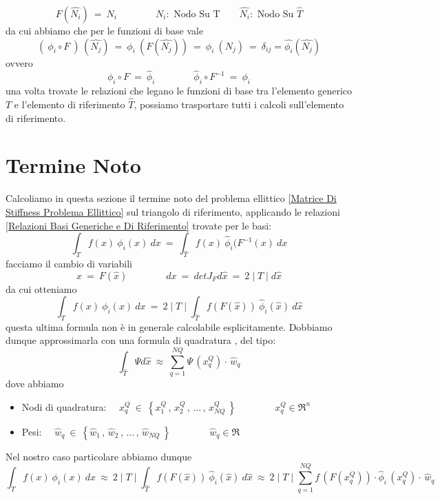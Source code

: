 \documentclass[12pt,a4paper]{report}
\theoremstyle{theorem}
\theoremstyle{theorem}
\theoremstyle{definition}
\begin{document}
\[ F (\hat{N_{i}}) \ = \ N_{i} \qquad \qquad N_{i}: \text{ Nodo Su T} \qquad \hat{N_{i}}: \text{ Nodo Su } \hat{T}  \]
da cui abbiamo che per le funzioni di base vale
\[ ( \ \phi_{i} \circ F \ ) \, (\hat{N_{j}}) \ = \ \phi_{i} \ ( F(\hat{N_{j}})) \ = \ \phi_{i} \ (N_{j}) \ = \ \delta_{ij} = \hat{\phi_{i}}(\hat{N_{j}}) \]
ovvero  \label{Relazioni Basi Generiche e Di Riferimento} 
\[ \phi_{i} \circ F \ = \ \hat{\phi}_{i} \qquad \qquad \hat{\phi}_{i} \circ F^{-1} \ = \ \phi_{i} \]
una volta trovate le relazioni che legano le funzioni di base tra l'elemento generico $T$ e l'elemento di riferimento $\hat{T}$, possiamo trasportare tutti i calcoli sull'elemento di riferimento.

\section{Termine Noto}
Calcoliamo in questa sezione il termine noto del problema ellittico \ref{Matrice Di Stiffness Problema Ellittico} sul triangolo di riferimento, applicando le relazioni \ref{Relazioni Basi Generiche e Di Riferimento} trovate per le basi:
\[ \int_{T}{f(x) \ \phi_{i}(x) \ dx} \ = \ \int_{\hat{T}}{f(x) \ \hat{\phi}_{i}(F^{-1}(x) \ dx} \]
facciamo il cambio di variabili
\[ x \ = \ F(\hat{x}) \qquad \qquad dx \ = \ detJ_{F}d\hat{x} \ = \ 2 \mid T \mid d\hat{x} \]
da cui otteniamo
\[ \int_{T}{f(x) \ \phi_{i}(x) \ dx} \ = \ 2 \mid T \mid \int_{\hat{T}}{f(F(\hat{x})) \ \hat{\phi}_{i}(\hat{x}) \ d \hat{x}} \]
questa ultima formula non è in generale calcolabile esplicitamente. Dobbiamo dunque approssimarla con una formula di quadratura \cite[, Capitolo 8]{QSS}, del tipo: \label{Formula di Quadratura} 
\[ \int_{\hat{T}}{\Psi d \hat{x}} \ \approx \ \sum_{q = 1}^{NQ} { \Psi \, (x_{q}^{Q} ) \cdot \, \hat{w}_{q} } \]
dove abbiamo
\begin{itemize}
	\item Nodi di quadratura: $ \quad x_{q}^{Q} \ \in \ \left \{ x_{1}^{Q} \, , \, x_{2}^{Q} \, , \, . . . \, , \, x_{NQ}^{Q} \ \right \} \qquad \qquad x_{q}^{Q} \in \Re^{n}$
	\item Pesi: $ \quad \hat{w}_{q} \ \in \ \left \{ \hat{w}_{1} \, , \, \hat{w}_{2} \, , \, . . . \, , \, \hat{w}_{NQ} \ \right \} \qquad \qquad \hat{w}_{q} \in \Re $
\end{itemize}
Nel nostro caso particolare abbiamo dunque
\[ \int_{T}{f(x) \ \phi_{i}(x) \ dx} \ \approx \ 2 \mid T \mid \int_{\hat{T}}{f(F(\hat{x})) \ \hat{\phi}_{i}(\hat{x}) \ d \hat{x}} \ \approx \ 2 \mid T \mid \sum_{q = 1}^{NQ} { f \, (F(x_{q}^{Q} )) \cdot \hat{\phi}_{i} \, ( x_{q}^{Q} ) \cdot \, \hat{w}_{q} } \]
\end{document}
